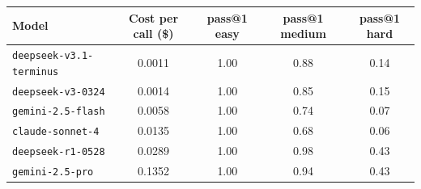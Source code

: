 \begin{tabular}{lcccc}
\toprule
Model & Cost per call (\$) & pass@1 easy & pass@1 medium & pass@1 hard \\
\midrule
\texttt{deepseek-v3.1-terminus} & 0.0011 & 1.00 & 0.88 & 0.14 \\
\texttt{deepseek-v3-0324} & 0.0014 & 1.00 & 0.85 & 0.15 \\
\texttt{gemini-2.5-flash} & 0.0058 & 1.00 & 0.74 & 0.07 \\
\texttt{claude-sonnet-4} & 0.0135 & 1.00 & 0.68 & 0.06 \\
\texttt{deepseek-r1-0528} & 0.0289 & 1.00 & 0.98 & 0.43 \\
\texttt{gemini-2.5-pro} & 0.1352 & 1.00 & 0.94 & 0.43 \\
\bottomrule
\end{tabular}